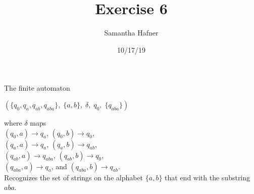 \documentclass[12pt]{article}
\title{Exercise 6}
\author{Samantha Hafner}
\date{10/17/19}
\begin{document}
\maketitle

The finite automaton

\begin{center} $(\{q_0, q_a, q_{ab}, q_{aba}\},\;\{a, b\},\;\delta,\;q_0,\;\{q_{aba}\})$\end{center}

where $\delta$ maps \\
$(q_0,a)\rightarrow q_a$, $(q_0,b)\rightarrow q_0$,\\
$(q_a,a)\rightarrow q_a$, $(q_a,b)\rightarrow q_{ab}$,\\
$(q_{ab},a)\rightarrow q_{aba}$, $(q_{ab},b)\rightarrow q_0$,\\
$(q_{aba},a)\rightarrow q_a$, and $(q_{aba},b)\rightarrow q_{ab}$.\\

Recognizes the set of strings on the alphabet $\{a, b\}$ that end with the substring $aba$.
\end{document}
